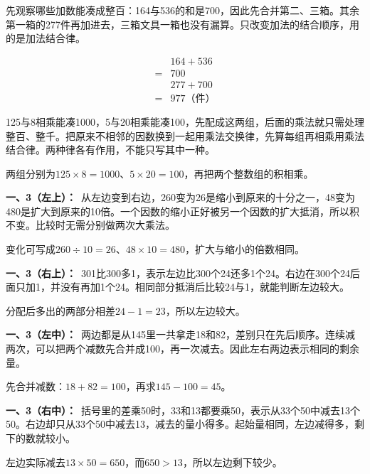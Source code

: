 \documentclass[multi=snippet,border=0pt]{standalone}
\newenvironment{snippet}[3]{\begin{minipage}{#1bp}\color{answerred}\fontsize{#2}{#3}\selectfont\raggedright}{\end{minipage}}
\begin{document}
\begin{snippet}{505}{11.5}{14}先观察哪些加数能凑成整百：164与536的和是700，因此先合并第二、三箱。其余第一箱的277件再加进去，三箱文具一箱也没有漏算。只改变加法的结合顺序，用的是加法结合律。\par \[\begin{aligned}&164+536\\={}&700\\&277+700\\={}&977\text{（件）}\end{aligned}\]\end{snippet}
\begin{snippet}{505}{11.5}{14}125与8相乘能凑1000，5与20相乘能凑100，先配成这两组，后面的乘法就只需处理整百、整千。把原来不相邻的因数换到一起用乘法交换律，先算每组再相乘用乘法结合律。两种律各有作用，不能只写其中一种。\par 两组分别为\(125\times8=1000\)、\(5\times20=100\)，再把两个整数组的积相乘。\end{snippet}
\begin{snippet}{505}{11.5}{14}\textbf{一、3（左上）：}\ 从左边变到右边，260变为26是缩小到原来的十分之一，48变为480是扩大到原来的10倍。一个因数的缩小正好被另一个因数的扩大抵消，所以积不变。比较时无需分别做两次大乘法。\par 变化可写成\(260\div10=26\)、\(48\times10=480\)，扩大与缩小的倍数相同。\end{snippet}
\begin{snippet}{505}{11.5}{14}\textbf{一、3（右上）：}\ 301比300多1，表示左边比300个24还多1个24。右边在300个24后面只加1，并没有再加1个24。相同部分抵消后比较24与1，就能判断左边较大。\par 分配后多出的两部分相差\(24-1=23\)，所以左边较大。\end{snippet}
\begin{snippet}{505}{11.5}{14}\textbf{一、3（左中）：}\ 两边都是从145里一共拿走18和82，差别只在先后顺序。连续减两次，可以把两个减数先合并成100，再一次减去。因此左右两边表示相同的剩余量。\par 先合并减数：\(18+82=100\)，再求\(145-100=45\)。\end{snippet}
\begin{snippet}{505}{11.5}{14}\textbf{一、3（右中）：}\ 括号里的差乘50时，33和13都要乘50，表示从33个50中减去13个50。右边却只从33个50中减去13，减去的量小得多。起始量相同，左边减得多，剩下的数就较小。\par 左边实际减去\(13\times50=650\)，而\(650>13\)，所以左边剩下较少。\end{snippet}
\end{document}
